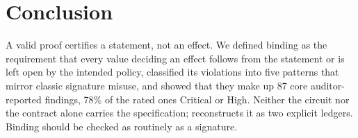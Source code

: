 \section{Conclusion}\label{sec:conclusion}

A valid proof certifies a statement, not an effect. We defined binding as the
requirement that every value deciding an effect follows from the statement or
is left open by the intended policy, classified its violations into five
patterns that mirror classic signature misuse, and showed that they make up
87 core auditor-reported findings, 78\% of the rated ones Critical or High.
Neither the circuit nor the contract alone carries the specification;
\tool{} reconstructs it as two explicit ledgers.  Binding should be checked as routinely as a
signature.
